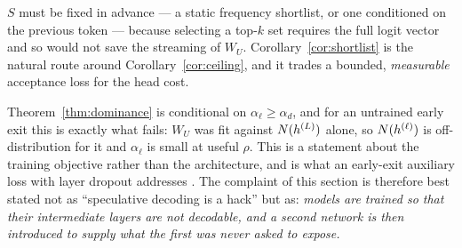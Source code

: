 \begin{remark}
$S$ must be fixed in advance --- a static frequency shortlist, or one conditioned
on the previous token --- because selecting a top-$k$ set requires the full logit
vector and so would not save the streaming of $W_U$. Corollary~\ref{cor:shortlist}
is the natural route around Corollary~\ref{cor:ceiling}, and it trades a bounded,
\emph{measurable} acceptance loss for the head cost.
\end{remark}

\begin{remark}
\label{rem:offdist}
Theorem~\ref{thm:dominance} is conditional on $\alpha_\ell \ge \alpha_d$, and
for an untrained early exit this is exactly what fails: $W_U$ was fit against
$N(h^{(L)})$ alone, so $N(h^{(\ell)})$ is off-distribution for it and
$\alpha_\ell$ is small at useful $\rho$. This is a statement about the training
objective rather than the architecture, and is what an early-exit auxiliary loss
with layer dropout addresses \cite{elhoushi2024,zhang2023draft}. The complaint of
this section is therefore best stated not as ``speculative decoding is a hack''
but as: \emph{models are trained so that their intermediate layers are not
decodable, and a second network is then introduced to supply what the first was
never asked to expose.}
\end{remark}
